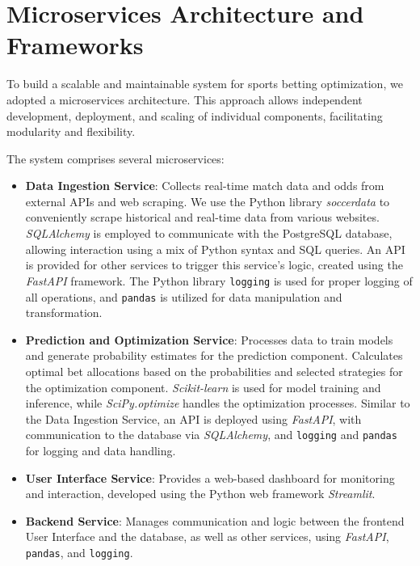 \section{Microservices Architecture and Frameworks}

To build a scalable and maintainable system for sports betting optimization, we adopted a microservices architecture. This approach allows independent development, deployment, and scaling of individual components, facilitating modularity and flexibility.

The system comprises several microservices:

\begin{itemize}
    \item \textbf{Data Ingestion Service}: Collects real-time match data and odds from external APIs and web scraping. We use the Python library \textit{soccerdata} to conveniently scrape historical and real-time data from various websites. \textit{SQLAlchemy} is employed to communicate with the PostgreSQL database, allowing interaction using a mix of Python syntax and SQL queries. An API is provided for other services to trigger this service's logic, created using the \textit{FastAPI} framework. The Python library \texttt{logging} is used for proper logging of all operations, and \texttt{pandas} is utilized for data manipulation and transformation.

    \item \textbf{Prediction and Optimization Service}: Processes data to train models and generate probability estimates for the prediction component. Calculates optimal bet allocations based on the probabilities and selected strategies for the optimization component. \textit{Scikit-learn} is used for model training and inference, while \textit{SciPy.optimize} handles the optimization processes. Similar to the Data Ingestion Service, an API is deployed using \textit{FastAPI}, with communication to the database via \textit{SQLAlchemy}, and \texttt{logging} and \texttt{pandas} for logging and data handling.

    \item \textbf{User Interface Service}: Provides a web-based dashboard for monitoring and interaction, developed using the Python web framework \textit{Streamlit}.

    \item \textbf{Backend Service}: Manages communication and logic between the frontend User Interface and the database, as well as other services, using \textit{FastAPI}, \texttt{pandas}, and \texttt{logging}.


\end{itemize}
